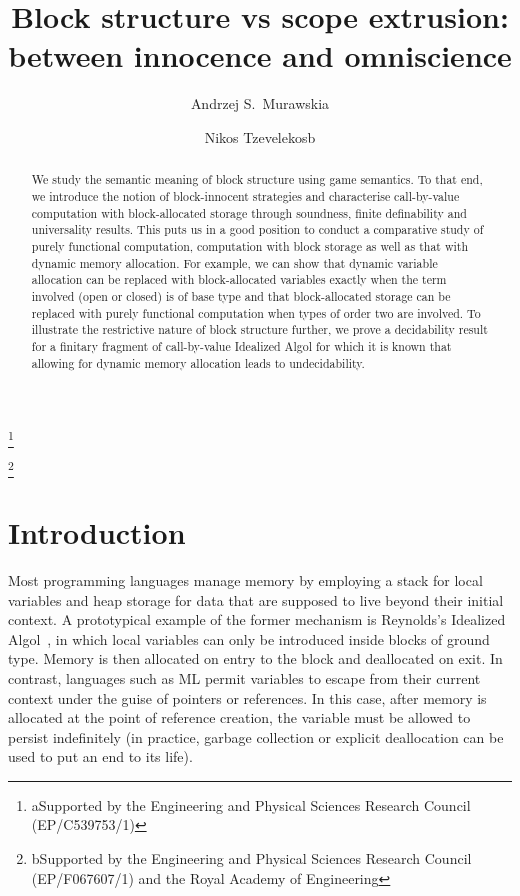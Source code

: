 \documentclass{CSML}
\theoremstyle{definition}\newtheorem{definition}[thm]{Definition}
\theoremstyle{definition}\newtheorem{example}[thm]{Example}
\theoremstyle{definition}\newtheorem{proposition}[thm]{Proposition}
\theoremstyle{definition}\newtheorem{lemma}[thm]{Lemma}
\theoremstyle{definition}\newtheorem{theorem}[thm]{Theorem}
\theoremstyle{definition}\newtheorem{corollary}[thm]{Corollary}
\theoremstyle{definition}\newtheorem{remark}[thm]{Remark}
\begin{document}
\title[Block structure vs scope extrusion]{Block structure vs scope extrusion: between innocence and omniscience\rsuper*}

\author[A.S.~Murawski]{Andrzej S.\ Murawski\rsuper a}
\address{{\lsuper a}University of Warwick}
\thanks{{\lsuper a}Supported by the 
Engineering and Physical Sciences Research Council (EP/C539753/1)}

\author[N.~Tzevelekos]{Nikos Tzevelekos\rsuper b}
\address{{\lsuper b}Queen Mary University of London}
\thanks{{\lsuper b}Supported by the 
Engineering and Physical Sciences Research Council (EP/F067607/1)
and the Royal Academy of Engineering}




\begin{abstract}
We study the semantic meaning of block structure using game semantics.
To that end, we introduce the notion of block-innocent strategies and
characterise call-by-value computation with block-allocated storage
through soundness, finite definability and universality results.
This puts us in a good position to conduct a comparative study of
purely functional computation, computation with block storage as well as
that with dynamic memory allocation.
For example, we can show that dynamic variable allocation
can be replaced with block-allocated variables exactly when the
term involved (open or closed) is of base type and that block-allocated
storage can be replaced with purely functional computation
when types of order two are involved.
To illustrate the restrictive nature of block structure further,
we prove a decidability result for a finitary fragment of call-by-value
Idealized Algol for which it is known that allowing for dynamic memory
allocation leads to undecidability.
\end{abstract}

\maketitle



\section{Introduction}

Most programming languages manage memory
by employing a stack for local variables and heap storage
for data that are supposed to live beyond their initial context.
A prototypical example of the former mechanism is Reynolds's
Idealized Algol~\cite{Rey81}, in which local variables can only
be introduced inside blocks of ground type. Memory is then allocated
on entry to the block and deallocated on exit.
In contrast, languages such as ML permit variables to escape
from their current context under the guise of pointers or references.
In this case, after memory is allocated at the point of reference creation,
the variable must be allowed to persist indefinitely (in practice, garbage collection
or explicit deallocation can be used to put an end to its life).
\end{document}
